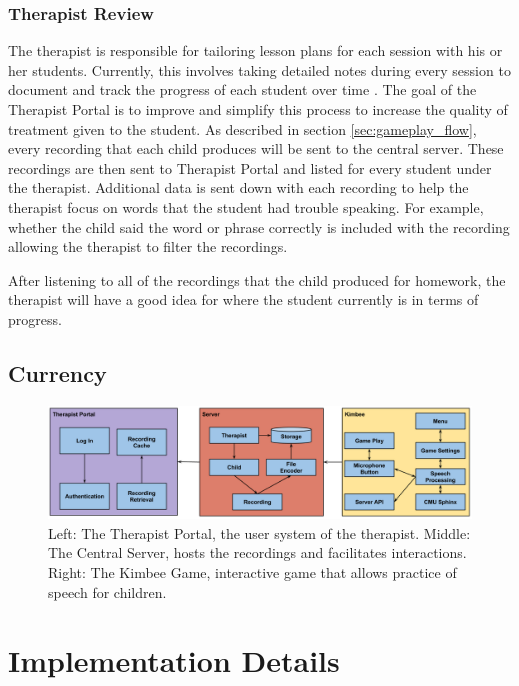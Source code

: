 \documentclass{sig-alternate-2013}
\begin{document}
\subsubsection{Therapist Review}

The therapist is responsible for tailoring lesson plans for each session with his or her students. Currently, this involves taking detailed notes during every session to document and track the progress of each student over time \cite{Kreider:Intro}. The goal of the Therapist Portal is to improve and simplify this process to increase the quality of treatment given to the student. As described in section \ref{sec:gameplay_flow}, every recording that each child produces will be sent to the central server. These recordings are then sent to Therapist Portal and listed for every student under the therapist. Additional data is sent down with each recording to help the therapist focus on words that the student had trouble speaking. For example, whether the child said the word or phrase correctly is included with the recording allowing the therapist to filter the recordings.

After listening to all of the recordings that the child produced for homework, the therapist will have a good idea for where the student currently is in terms of progress.

\subsection{Currency}

\begin{figure}[t]
  \centering
  \includegraphics[keepaspectratio, width=\textwidth]{tech_figure.png}
  \vspace{-23 pt}
  \caption{\normalfont Left: The Therapist Portal, the user system of the therapist. Middle: The Central Server, hosts the recordings and facilitates interactions. Right: The Kimbee Game, interactive game that allows practice of speech for children. }
  \label{fig:tech}
\end{figure}

\section{Implementation Details}
\end{document}
